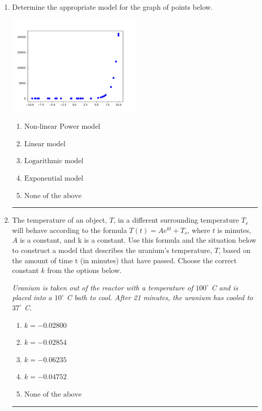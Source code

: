 \documentclass[14pt]{extbook}
\newcommand{\litem}[1]{\item#1\hspace*{-1cm}\rule{\textwidth}{0.4pt}}
\begin{document}
\begin{enumerate}
{\begin{enumerate}[label=\Alph*.]
\end{enumerate} }
\litem{
Determine the appropriate model for the graph of points below.
\begin{center}
    \includegraphics[width=0.5\textwidth]{../Figures/identifyModelGraph12CopyB.png}
\end{center}
\begin{enumerate}[label=\Alph*.]
\item \( \text{Non-linear Power model} \)
\item \( \text{Linear model} \)
\item \( \text{Logarithmic model} \)
\item \( \text{Exponential model} \)
\item \( \text{None of the above} \)

\end{enumerate} }
\litem{
The temperature of an object, $T$, in a different surrounding temperature $T_s$ will behave according to the formula $T(t) = Ae^{kt} + T_s$, where $t$ is minutes, $A$ is a constant, and k is a constant. Use this formula and the situation below to construct a model that describes the uranium's temperature, $T$, based on the amount of time t (in minutes) that have passed. Choose the correct constant $k$ from the options below.
\begin{center}
    \textit{ Uranium is taken out of the reactor with a temperature of $100^{\circ}$ C and is placed into a $10^{\circ}$ C bath to cool. After 21 minutes, the uranium has cooled to $37^{\circ}$ C. }
\end{center}
\begin{enumerate}[label=\Alph*.]
\item \( k = -0.02800 \)
\item \( k = -0.02854 \)
\item \( k = -0.06235 \)
\item \( k = -0.04752 \)
\item \( \text{None of the above} \)


\end{enumerate}}
\end{enumerate}
\end{document}
